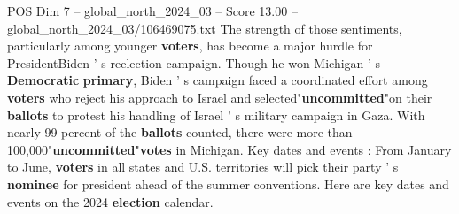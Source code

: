 \begin{textsample}{POS Dim 7 – global\_north\_2024\_03 – Score 13.00 – global\_north\_2024\_03/106469075.txt}
The strength of those sentiments, particularly among younger \textbf{voters}, has become a major hurdle for PresidentBiden ' s reelection campaign.
Though he won Michigan ' s \textbf{Democratic} \textbf{primary}, Biden ' s campaign faced a coordinated effort among \textbf{voters} who reject his approach to Israel and selected"\textbf{uncommitted}"on their \textbf{ballots} to protest his handling of Israel ' s military campaign in Gaza.
With nearly 99 percent of the \textbf{ballots} counted, there were more than 100,000"\textbf{uncommitted}"\textbf{votes} in Michigan.
Key dates and events : From January to June, \textbf{voters} in all states and U.S. territories will pick their party ' s \textbf{nominee} for president ahead of the summer conventions.
Here are key dates and events on the 2024 \textbf{election} calendar.

\end{textsample}
